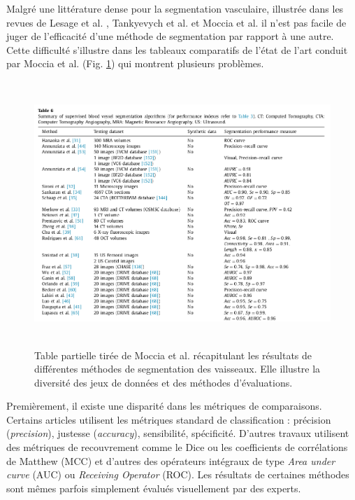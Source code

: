     Malgré une littérature dense pour la segmentation vasculaire, illustrée dans les revues de Lesage et al. \cite{Lesage2009_review}, Tankyevych et al. \cite{Tankyevych2011_angiographic} et Moccia et al. \cite{Moccia2018_survey} il n'est pas facile de juger de l'efficacité d'une méthode de segmentation par rapport à une autre. Cette difficulté s'illustre dans les tableaux comparatifs de l'état de l'art conduit par  Moccia et al. (Fig. \ref{fig:moccia_table}) qui montrent plusieurs problèmes.

    \begin{figure}[h]
      \centering
      \includegraphics[height=10cm]{Images/Moccia_example.png}
      \caption{Table partielle tirée de Moccia et al. \cite{Moccia2018_survey} récapitulant les résultats de différentes méthodes de segmentation des vaisseaux. Elle illustre la diversité des jeux de données et des méthodes d'évaluations.}
      \label{fig:moccia_table}
    \end{figure}

    Premièrement, il existe une disparité dans les métriques de comparaisons. Certains articles utilisent les métriques standard de classification : précision (\textit{precision}), justesse (\textit{accuracy}), sensibilité, spécificité. D'autres travaux utilisent des métriques de recouvrement comme le Dice ou les coefficients de corrélations de Matthew (MCC) et d'autres des opérateurs intégraux de type \textit{Area under curve} (AUC) ou \textit{Receiving Operator} (ROC). Les résultats de certaines méthodes sont mêmes parfois simplement évalués visuellement par des experts.

